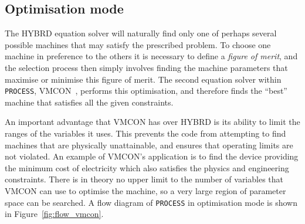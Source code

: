 \documentclass[11pt,a4paper]{report}
\newcommand{\process}{\mbox{\texttt{PROCESS}}}
\begin{document}
\subsection{Optimisation mode}

The HYBRD equation solver will naturally find only one of perhaps several
possible machines that may satisfy the prescribed problem. To choose one
machine in preference to the others it is necessary to define a \textit{figure
of merit}, and the selection process then simply involves finding the
machine parameters that maximise or minimise this figure of merit. The second
equation solver within \process, VMCON~\cite{vmcon}, performs this
optimisation, and therefore finds the ``best'' machine that satisfies all the
given constraints.

An important advantage that VMCON has over HYBRD is its ability to limit the
ranges of the variables it uses. This prevents the code from attempting to
find machines that are physically unattainable, and ensures that operating
limits are not violated. An example of VMCON's application is to find the
device providing the minimum cost of electricity which also satisfies the
physics and engineering constraints. There is in theory no upper limit to the
number of variables that VMCON can use to optimise the machine, so a very
large region of parameter space can be searched. A flow diagram of \process\/
in optimisation mode is shown in Figure~\ref{fig:flow_vmcon}.


\setlength{\unitlength}{1mm}
\end{document}
